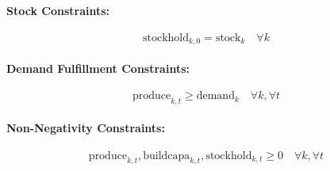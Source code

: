 \documentclass{article}
\begin{document}
\paragraph{Stock Constraints:}
\[
\text{stockhold}_{k,0} = \text{stock}_{k} \quad \forall k
\]

\paragraph{Demand Fulfillment Constraints:}
\[
\text{produce}_{k,t} \geq \text{demand}_{k} \quad \forall k, \forall t
\]

\paragraph{Non-Negativity Constraints:}
\[
\text{produce}_{k,t}, \text{buildcapa}_{k,t}, \text{stockhold}_{k,t} \geq 0 \quad \forall k, \forall t
\]
\end{document}
